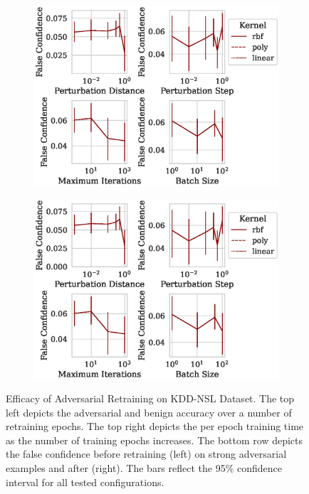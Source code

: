\documentclass[fonts]{icst}
\begin{document}
\begin{appendices}
\begin{figure}[h!]
\begin{subfigure}{0.47\textwidth}
     \end{subfigure}
     \hfill
     \begin{subfigure}{0.47\textwidth}
         \centering
         \includegraphics[width=\textwidth]{./kdd-nsl/confidence_vs_attack_parameters.eps}
     \end{subfigure}
     \hfill
     \begin{subfigure}{0.47\textwidth}
         \centering
         \includegraphics[width=\textwidth]{./kdd-nsl/retrain_confidence_vs_attack_parameters.eps}
     \end{subfigure}
     \hfill
     \caption{Efficacy of Adversarial Retraining on KDD-NSL Dataset. The top left depicts the adversarial and benign accuracy over a number of retraining epochs. The top right depicts the per epoch training time as the number of training epochs increases. The bottom row depicts the false confidence before retraining (left) on strong adversarial examples and after (right).  The bars reflect the 95\% confidence interval for all tested configurations.}
     \label{fig:kdd-nsl}
\end{figure}
\pagebreak
\onecolumn

\end{appendices}
\end{document}

